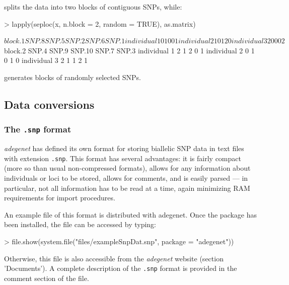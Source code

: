 \documentclass{article}
\begin{document}
splits the data into two blocks of contiguous SNPs, while:
\begin{Schunk}
\begin{Sinput}
> lapply(seploc(x, n.block = 2, random = TRUE), as.matrix)
\end{Sinput}
\begin{Soutput}
$block.1
             SNP.8 SNP.5 SNP.2 SNP.6 SNP.1
individual 1     0     1     0     0     1
individual 2     1     0     1     2     0
individual 3     2     0     0     0     2

$block.2
             SNP.4 SNP.9 SNP.10 SNP.7 SNP.3
individual 1     2     1      2     0     1
individual 2     0     1      0     1     0
individual 3     2     1      1     2     1
\end{Soutput}
\end{Schunk}
generates blocks of randomly selected SNPs.




\subsection{Data conversions}

\subsubsection{The \texttt{.snp} format}

\textit{adegenet} has defined its own format for storing biallelic SNP data in text files with
extension \texttt{.snp}.
This format has several advantages: it is fairly compact (more so than usual non-compressed
formats), allows for any information about individuals or loci to be stored, allows for comments,
and is easily parsed --- in particular, not all information has to be read at a time, again
minimizing RAM requirements for import procedures.


An example file of this format is distributed with adegenet.
Once the package has been installed, the file can be accessed by typing:
\begin{Schunk}
\begin{Sinput}
> file.show(system.file("files/exampleSnpDat.snp", package = "adegenet"))
\end{Sinput}
\end{Schunk}
Otherwise, this file is also accessible from the \textit{adegenet} website (section 'Documents').
A complete description of the \texttt{.snp} format is provided in the comment section of the file.
\\
\end{document}
